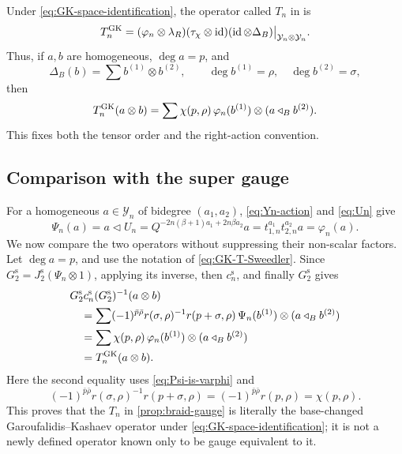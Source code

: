 \documentclass[11pt,a4paper]{article}
\newcommand{\ot}{\otimes}
\newcommand{\tri}{\mathbin{\triangleleft}}
\newcommand{\id}{\operatorname{id}}
\theoremstyle{definition}
\theoremstyle{remark}
\begin{document}
Under \eqref{eq:GK-space-identification}, the operator called \(T_n\) in
\cite[Theorem~3.6 and Definition~7.5]{GK} is
\begin{equation}\label{eq:GK-T-definition}
 T_n^{\rm GK}
 =
 (\varphi_n\ot\lambda_R)
 (\tau_\chi\ot\id)
 (\id\ot\Delta_B)
 \big|_{\mathcal Y_n\ot\mathcal Y_n}.
\end{equation}
Thus, if \(a,b\) are homogeneous, \(\deg a=p\), and
\[
 \Delta_B(b)=\sum b^{(1)}\ot b^{(2)},\qquad
 \deg b^{(1)}=\rho,\quad \deg b^{(2)}=\sigma,
\]
then
\begin{equation}\label{eq:GK-T-Sweedler}
 T_n^{\rm GK}(a\ot b)
 =\sum \chi(p,\rho)\,
 \varphi_n(b^{(1)})\ot(a\tri_B b^{(2)}).
\end{equation}
This fixes both the tensor order and the right-action convention.

\subsection{Comparison with the super gauge}
\label{app:GK-super-gauge}

For a homogeneous \(a\in\mathcal Y_n\) of bidegree \((a_1,a_2)\),
\eqref{eq:Yn-action} and \eqref{eq:Un} give
\begin{equation}\label{eq:Psi-is-varphi}
 \Psi_n(a)=a\tri U_n
 =Q^{-2n(\beta+1)a_1+2n\beta a_2}a
 =t_{1,n}^{a_1}t_{2,n}^{a_2}a
 =\varphi_n(a).
\end{equation}
We now compare the two operators without suppressing their non-scalar
factors.  Let \(\deg a=p\), and use the notation of
\eqref{eq:GK-T-Sweedler}.  Since
\(G_2^{\mathrm s}=J_2^{\mathrm s}(\Psi_n\ot1)\), applying its inverse,
then \(c_n^{\mathrm s}\), and finally \(G_2^{\mathrm s}\) gives
\begin{align*}
 &G_2^{\mathrm s}c_n^{\mathrm s}(G_2^{\mathrm s})^{-1}
 (a\ot b)\\
 &\quad=
 \sum(-1)^{\bar p\bar\rho}
 r(\sigma,\rho)^{-1}r(p+\sigma,\rho)\,
 \Psi_n(b^{(1)})\ot(a\tri_B b^{(2)})\\
 &\quad=
 \sum\chi(p,\rho)\,
 \varphi_n(b^{(1)})\ot(a\tri_B b^{(2)})\\
 &\quad=T_n^{\rm GK}(a\ot b).
\end{align*}
Here the second equality uses \eqref{eq:Psi-is-varphi} and
\[
 (-1)^{\bar p\bar\rho}
 r(\sigma,\rho)^{-1}r(p+\sigma,\rho)
 =(-1)^{\bar p\bar\rho}r(p,\rho)=\chi(p,\rho).
\]
This proves that the \(T_n\) in \cref{prop:braid-gauge} is literally the
base-changed Garoufalidis--Kashaev operator under
\eqref{eq:GK-space-identification}; it is not a newly defined operator
known only to be gauge equivalent to it.
\end{document}
